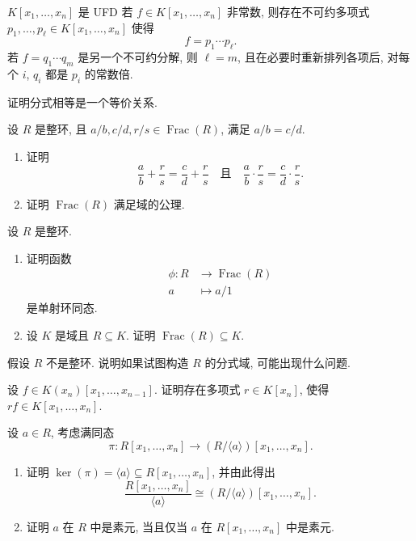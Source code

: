 \begin{Theorem}{{\textmd{$K[x_{1},\ldots,x_{n}]$} 是 UFD}}\label{thm:multivariate-polynomial-ring-ufd}
  若 $f\in K[x_{1},\ldots,x_{n}]$ 非常数, 则存在不可约多项式 $p_{1},\ldots,p_{\ell}\in K[x_{1},\ldots,x_{n}]$ 使得
  \[
    f=p_{1}\cdots p_{\ell}.
  \]
  若 $f=q_{1}\cdots q_{m}$ 是另一个不可约分解, 则 $\ell=m$, 且在必要时重新排列各项后, 对每个 $i$, $q_{i}$ 都是 $p_{i}$ 的常数倍.
\end{Theorem}

\BookExerciseHeading
\begin{BookExercises}
  \item\label{ex:fraction-equality-equivalence} 证明分式相等是一个等价关系.
  \item\label{ex:fraction-field-axioms} 设 $R$ 是整环, 且 $a/b,c/d,r/s\in\operatorname{Frac}(R)$, 满足 $a/b=c/d$.
    \begin{enumerate}[label=(\alph*)]
      \item 证明
        \[
          \frac{a}{b}+\frac{r}{s}=\frac{c}{d}+\frac{r}{s}
          \quad\text{且}\quad
          \frac{a}{b}\cdot\frac{r}{s}=\frac{c}{d}\cdot\frac{r}{s}.
        \]
      \item 证明 $\operatorname{Frac}(R)$ 满足域的公理.
    \end{enumerate}
  \item\label{ex:canonical-fraction-field-inclusion} 设 $R$ 是整环.
    \begin{enumerate}[label=(\alph*)]
      \item 证明函数
        \[
          \begin{aligned}
            \phi:R&\to\operatorname{Frac}(R)\\
            a&\mapsto a/1
          \end{aligned}
        \]
        是单射环同态.
      \item 设 $K$ 是域且 $R\subseteq K$. 证明 $\operatorname{Frac}(R)\subseteq K$.
    \end{enumerate}
  \item\label{ex:fraction-field-needs-domain} 假设 $R$ 不是整环. 说明如果试图构造 $R$ 的分式域, 可能出现什么问题.
  \item\label{ex:clear-polynomial-denominators} 设 $f\in K(x_{n})[x_{1},\ldots,x_{n-1}]$. 证明存在多项式 $r\in K[x_{n}]$, 使得 $rf\in K[x_{1},\ldots,x_{n}]$.
  \item\label{ex:prime-in-ring-and-polynomial-ring} 设 $a\in R$, 考虑满同态
    \[
      \pi:R[x_{1},\ldots,x_{n}]\to(R/\langle a\rangle)[x_{1},\ldots,x_{n}].
    \]
    \begin{enumerate}[label=(\alph*)]
      \item 证明 $\ker(\pi)=\langle a\rangle\subseteq R[x_{1},\ldots,x_{n}]$, 并由此得出
        \[
          \frac{R[x_{1},\ldots,x_{n}]}{\langle a\rangle}\cong(R/\langle a\rangle)[x_{1},\ldots,x_{n}].
        \]
      \item 证明 $a$ 在 $R$ 中是素元, 当且仅当 $a$ 在 $R[x_{1},\ldots,x_{n}]$ 中是素元.
    \end{enumerate}
\end{BookExercises}
